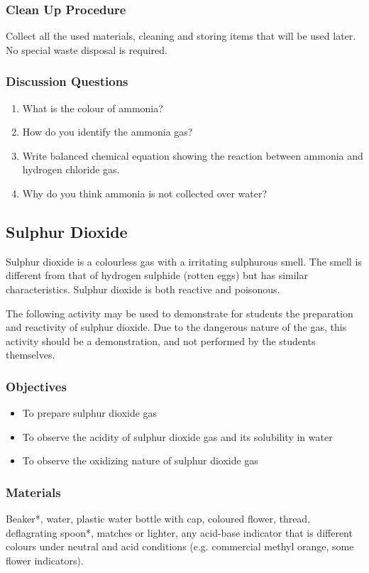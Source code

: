 \subsubsection*{Clean Up Procedure}
Collect all the used materials, cleaning and storing items that will be used later. No special waste disposal is required.

\subsubsection*{Discussion Questions}
\begin{enumerate}
\item{What is the colour of ammonia?}
\item{How do you identify the ammonia gas?}
\item{Write balanced chemical equation showing the reaction between ammonia and hydrogen chloride gas.}
\item{Why do you think ammonia is not collected over water?}
\end{enumerate}

\subsection{Sulphur Dioxide}

Sulphur dioxide is a colourless gas with a irritating sulphurous smell. The smell is different from that of hydrogen sulphide (rotten eggs) but has similar characteristics. Sulphur dioxide is both reactive and poisonous.

The following activity may be used to demonstrate for students the preparation and reactivity of sulphur dioxide. Due to the dangerous nature of the gas, this activity should be a demonstration, and not performed by the students themselves.

\subsubsection{Objectives}
\begin{itemize}
\item{To prepare sulphur dioxide gas}
\item{To observe the acidity of sulphur dioxide gas and its solubility in water}
\item{To observe the oxidizing nature of sulphur dioxide gas}
\end{itemize}

\subsubsection{Materials}
Beaker*, water, plastic water bottle with cap, coloured flower, thread, deflagrating spoon*, matches or lighter, any acid-base indicator that is different colours under neutral and acid conditions (e.g. commercial methyl orange, some flower indicators).

